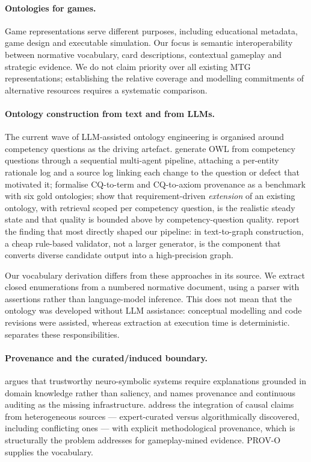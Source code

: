 \documentclass[11pt,a4paper]{article}
\begin{document}
\paragraph{Ontologies for games.} Game representations serve different purposes, including educational metadata, game design and executable simulation. Our focus is semantic interoperability between normative vocabulary, card descriptions, contextual gameplay and strategic evidence. We do not claim priority over all existing MTG representations; establishing the relative coverage and modelling commitments of alternative resources requires a systematic comparison.

\paragraph{Ontology construction from text and from LLMs.} The current wave of LLM-assisted ontology engineering is organised around competency questions as the driving artefact. \citet{garijo2026maseo} generate OWL from competency questions through a sequential multi-agent pipeline, attaching a per-entity rationale log and a source log linking each change to the question or defect that motivated it; \citet{cq4oe2026} formalise CQ-to-term and CQ-to-axiom provenance as a benchmark with six gold ontologies; \citet{lippolis2026ontoextend} show that requirement-driven \emph{extension} of an existing ontology, with retrieval scoped per competency question, is the realistic steady state and that quality is bounded above by competency-question quality. \citet{tiwari2026ontoprompt} report the finding that most directly shaped our pipeline: in text-to-graph construction, a cheap rule-based validator, not a larger generator, is the component that converts diverse candidate output into a high-precision graph.

Our vocabulary derivation differs from these approaches in its source. We extract closed enumerations from a numbered normative document, using a parser with assertions rather than language-model inference. This does not mean that the ontology was developed without LLM assistance: conceptual modelling and code revisions were assisted, whereas extraction at execution time is deterministic.  separates these responsibilities.

\paragraph{Provenance and the curated/induced boundary.} \citet{sabou2026neurosymbolic} argues that trustworthy neuro-symbolic systems require explanations grounded in domain knowledge rather than saliency, and names provenance and continuous auditing as the missing infrastructure. \citet{ehrenmuller2026sock} address the integration of causal claims from heterogeneous sources --- expert-curated versus algorithmically discovered, including conflicting ones --- with explicit methodological provenance, which is structurally the problem  addresses for gameplay-mined evidence. PROV-O supplies the vocabulary.
\end{document}

